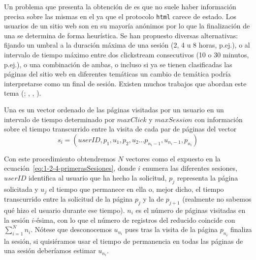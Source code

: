 Un problema que presenta la obtención de \sns es que no suele haber información precisa sobre las mismas en el \flog ya que el protocolo \texttt{html} carece de estado. Los usuarios de un sitio web son en su mayoría anónimos por lo que la finalización de una \sn se determina de forma heurística. Se han propuesto diversas alternativas: fijando un umbral a la duración máxima de una sesión (2, 4 u 8 horas, p.ej.), o al intervalo de tiempo máximo entre dos clickstream consecutivos (10 o 30 minutos, p.ej.), o una combinación de ambas, o incluso si ya se tienen clasificadas las páginas del sitio web en diferentes temáticas un cambio de temática podría interpretarse como un final de sesión. Existen muchos trabajos que abordan este tema (\cite{HeGoker-DetectingSessionBoundaries-2000,HuangPengAnSchuurmansCercone-SessionBoundaryDetection-2003}; \citeauthor{HuangPengAnSchuurmans-DynamicWebLogSessionBoundaryDetection-2004}, \cite*{HuangPengAnSchuurmans-DynamicWebLogSessionBoundaryDetection-2004}, \cite*{HuangPengAnSchuurmans-DynamicWebLogSessionIdentification-2004}).

\begin{defn}[\Sn]\label{def:1-2-4-sesion}
  Una \sn es un vector ordenado de las páginas visitadas por un usuario en un intervalo de tiempo determinado por $maxClick$ y $maxSession$ con información sobre el tiempo transcurrido entre la visita de cada par de páginas del vector
  \begin{equation}\label{eq:1-2-4-primerasSesiones}
    s_i = \left({userID}, p_1, u_1, p_2, u_2\ldots p_{n_i-1}, u_{n_i-1}, p_{n_i}\right)
  \end{equation}
\end{defn}

Con este procedimiento obtendremos $N$ vectores como el expuesto en la ecuación~\ref{eq:1-2-4-primerasSesiones}, donde $i$ enumera las diferentes sesiones, $userID$ identifica al usuario que ha hecho la solicitud, $p_j$ representa la página solicitada y $u_j$ el tiempo que permanece en ella o, mejor dicho, el tiempo transcurrido entre la solicitud de la página $p_j$ y la de $p_{j+1}$ (realmente no sabemos qué hizo el usuario durante ese tiempo). $n_i$ es el número de páginas visitadas en la sesión $i$-ésima, con lo que el número de registros del \flog reducido coincide con $\sum_{i=1}^N{n_i}$. Nótese que desconocemos $u_{n_i}$ pues tras la visita de la página $p_{n_i}$ finaliza la sesión, si quisiéramos usar el tiempo de permanencia en todas las páginas de una sesión deberíamos estimar $u_{n_i}$.

